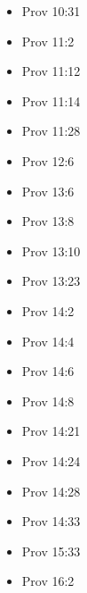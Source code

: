 \documentclass[14pt]{book}
\begin{document}
\begin{multicols}{2}
\begin{itemize}
									\item Prov 10:31
									
									\item Prov 11:2
									
									\item Prov 11:12
									
									\item Prov 11:14
									
									\item Prov 11:28
									
									\item Prov 12:6
									
									\item Prov 13:6
									
									\item Prov 13:8
									
									\item Prov 13:10
									
									\item Prov 13:23
									
									\item Prov 14:2
									
									\item Prov 14:4
									
									\item Prov 14:6
									
									\item Prov 14:8
									
									\item Prov 14:21
									
									\item Prov 14:24
									
									\item Prov 14:28
									
									\item Prov 14:33
									
									\item Prov 15:33
									
									\item Prov 16:2
									

\end{itemize}
\end{multicols}
\end{document}
